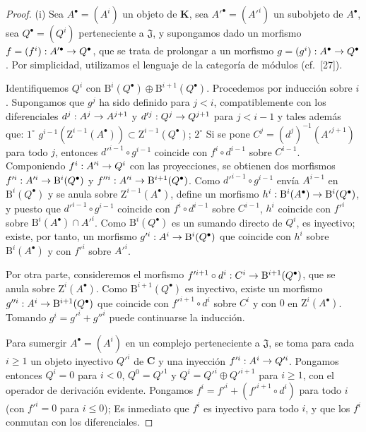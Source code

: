 \documentclass[10pt,oneside,openany]{book}
\theoremstyle{egaenv}\newtheorem*{env}{---}
\theoremstyle{egastatement}
\theoremstyle{egadescription}
\renewcommand{\leq}{\leqslant}
\renewcommand{\geq}{\geqslant}
\renewcommand{\to}{\mathchoice{\longrightarrow}{\rightarrow}{\rightarrow}{\rightarrow}}
\begin{document}
\begin{proof}
{\rm(i)}
Sea $A^\bullet=(A^i)$ un objeto de $\boldsymbol{K}$, sea $A'^\bullet=(A'^i)$ un subobjeto de $A^\bullet$, sea $Q^\bullet=(Q^i)$ perteneciente a $\mathfrak J$, y supongamos dado un morfismo
$f=(f^i):A'^\bullet\to Q^\bullet$, que se trata de prolongar a un morfismo $g=(g^i):A^\bullet\to Q^\bullet$.
Por simplicidad, utilizamos el lenguaje de la categoría de módulos (cf.~[27]).

Identifiquemos $Q^i$ con $\mathrm B^i(Q^\bullet)\oplus\mathrm B^{i+1}(Q^\bullet)$.
Procedemos por inducción sobre $i$.
Supongamos que $g^j$ ha sido definido para $j<i$, compatiblemente con los diferenciales $d^j:A^j\to A^{j+1}$ y $d'^j:Q^j\to Q^{j+1}$ para $j<i-1$ y tales además que: $1^\circ$ $g^{i-1}(\mathrm Z^{i-1}(A^\bullet))\subset
\mathrm Z^{i-1}(Q^\bullet)$; $2^\circ$ Si se pone $C^j=(d^j)^{-1}(A'^{j+1})$ para todo $j$, entonces $d'^{i-1}\circ g^{i-1}$ coincide con $f^i\circ d^{i-1}$ sobre $C^{i-1}$.
Componiendo $f^i:A'^i\to Q^i$ con las proyecciones, se obtienen dos morfismos $f'^i:A'^i\to\mathrm B^i(Q^\bullet)$ y $f''^i:A'^i\to\mathrm B^{i+1}(Q^\bullet)$. Como $d'^{i-1}\circ g^{i-1}$ envía $A^{i-1}$ en $\mathrm B^i(Q^\bullet)$ y se anula sobre $\mathrm Z^{i-1}(A^\bullet)$, define un morfismo
$h^i:\mathrm B^i(A^\bullet)\to\mathrm B^i(Q^\bullet)$, y puesto que $d'^{i-1}\circ g^{i-1}$ coincide con $f^i\circ d^{i-1}$ sobre $C^{i-1}$, $h^i$ coincide con $f'^i$ sobre $\mathrm B^i(A^\bullet)\cap A'^i$.
Como $\mathrm B^i(Q^\bullet)$ es un sumando directo de $Q^i$, es inyectivo; existe, por tanto, un morfismo
$g'^i:A^i\to\mathrm B^i(Q^\bullet)$
que coincide con $h^i$ sobre $\mathrm B^i(A^\bullet)$ y con $f'^i$ sobre $A'^i$.

Por otra parte, consideremos el morfismo
$f'^{i+1}\circ d^i:C^i\to\mathrm B^{i+1}(Q^\bullet)$,
que se anula sobre $\mathrm Z^i(A^\bullet)$.
Como $\mathrm B^{i+1}(Q^\bullet)$ es inyectivo, existe un morfismo
$g''^i:A^i\to\mathrm B^{i+1}(Q^\bullet)$
que coincide con $f'^{i+1}\circ d^i$ sobre $C^i$ y con $0$ en $\mathrm Z^i(A^\bullet)$.
Tomando $g^i=g'^i+g''^i$ puede continuarse la inducción.

\smallskip
{}
Para sumergir $A^\bullet=(A^i)$ en un complejo perteneciente a $\mathfrak J$, se toma para cada $i\geq1$ un objeto inyectivo $Q'^i$ de $\boldsymbol{C}$ y una inyección $f'^i:A^i\to Q'^i$. Pongamos entonces $Q^i=0$ para $i<0$, $Q^0=Q'^1$ y $Q^i=Q'^i\oplus Q'^{i+1}$ para $i\geq1$, con el operador de derivación evidente. Pongamos
$f^i=f'^i+(f'^{i+1}\circ d^i)$ para todo $i$ (con $f'^i=0$ para $i\leq0$);
Es inmediato que $f^i$ es inyectivo para todo $i$, y que los $f^i$ conmutan con los diferenciales.
\end{proof}
\end{document}
